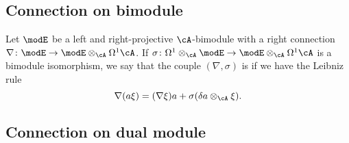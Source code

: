 \subsection{Connection on bimodule}

Let $\modE$ be a left and right-projective $\cA$-bimodule with a right connection $\nabla\colon \modE\to \modE\otimes_{\cA}\Omega^1\cA$. If $\sigma\colon \Omega^1\otimes_{\cA}\modE\to \modE\otimes_{\cA}\Omega^1\cA$ is a bimodule isomorphism, we say that the couple $(\nabla,\sigma)$ is  if we have the Leibniz rule
\begin{equation}
	\nabla(a\xi)=(\nabla\xi)a+\sigma(\delta a\otimes_{\cA}\xi).
\end{equation}

\subsection{Connection on dual module}

